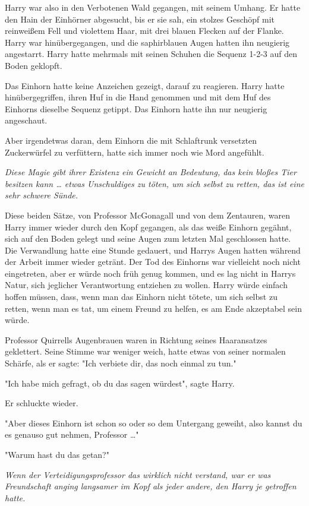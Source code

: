 {Harry war also in den Verbotenen Wald gegangen, mit seinem Umhang. Er hatte den Hain der Einhörner abgesucht, bis er sie sah, ein stolzes Geschöpf mit reinweißem Fell und violettem Haar, mit drei blauen Flecken auf der Flanke. Harry war hinübergegangen, und die saphirblauen Augen hatten ihn neugierig angestarrt. Harry hatte mehrmals mit seinen Schuhen die Sequenz 1-2-3 auf den Boden geklopft.

Das Einhorn hatte keine Anzeichen gezeigt, darauf zu reagieren. Harry hatte hinübergegriffen, ihren Huf in die Hand genommen und mit dem Huf des Einhorns dieselbe Sequenz getippt. Das Einhorn hatte ihn nur neugierig angeschaut.

Aber irgendetwas daran, dem Einhorn die mit Schlaftrunk versetzten Zuckerwürfel zu verfüttern, hatte sich immer noch wie Mord angefühlt.

\emph{Diese Magie gibt ihrer Existenz ein Gewicht an Bedeutung, das kein bloßes Tier besitzen kann … etwas Unschuldiges zu töten, um sich selbst zu retten, das ist eine sehr schwere Sünde.}

Diese beiden Sätze, von Professor McGonagall und von dem Zentauren, waren Harry immer wieder durch den Kopf gegangen, als das weiße Einhorn gegähnt, sich auf den Boden gelegt und seine Augen zum letzten Mal geschlossen hatte. Die Verwandlung hatte eine Stunde gedauert, und Harrys Augen hatten während der Arbeit immer wieder getränt. Der Tod des Einhorns war vielleicht noch nicht eingetreten, aber er würde noch früh genug kommen, und es lag nicht in Harrys Natur, sich jeglicher Verantwortung entziehen zu wollen. Harry würde einfach hoffen müssen, dass, wenn man das Einhorn nicht tötete, um sich selbst zu retten, wenn man es tat, um einem Freund zu helfen, es am Ende akzeptabel sein würde.

Professor Quirrells Augenbrauen waren in Richtung seines Haaransatzes geklettert. Seine Stimme war weniger weich, hatte etwas von seiner normalen Schärfe, als er sagte: "Ich verbiete dir, das noch einmal zu tun."

"Ich habe mich gefragt, ob du das sagen würdest", sagte Harry.

Er schluckte wieder.

"Aber dieses Einhorn ist schon so oder so dem Untergang geweiht, also kannst du es genauso gut nehmen, Professor …"

"Warum hast du das getan?"

\emph{Wenn der Verteidigungsprofessor das wirklich nicht verstand, war er was Freundschaft anging langsamer im Kopf als jeder andere, den Harry je getroffen hatte.}

}
